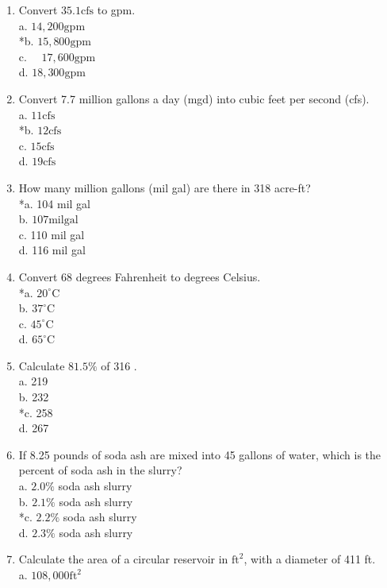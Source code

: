 \begin{enumerate}
\item Convert $35.1 \mathrm{cfs}$ to gpm.\\
a. $14,200 \mathrm{gpm}$\\
*b. $15,800 \mathrm{gpm}$\\
c. $\quad 17,600 \mathrm{gpm}$\\
d. $18,300 \mathrm{gpm}$
\item Convert 7.7 million gallons a day (mgd) into cubic feet per second (cfs).\\
a. $11 \mathrm{cfs}$\\
*b. $12 \mathrm{cfs}$\\
c. $15 \mathrm{cfs}$\\
d. $19 \mathrm{cfs}$\\
\item How many million gallons (mil gal) are there in 318 acre-ft?\\
*a. 104 mil gal\\
b. $107 \mathrm{mil} \mathrm{gal}$\\
c. 110 mil gal\\
d. 116 mil gal\\
\item Convert 68 degrees Fahrenheit to degrees Celsius.\\
*a. $20^{\circ} \mathrm{C}$\\
b. $37^{\circ} \mathrm{C}$\\
c. $45^{\circ} \mathrm{C}$\\
d. $65^{\circ} \mathrm{C}$\\
\item Calculate $81.5 \%$ of 316 .\\
a. 219\\
b. 232\\
*c. 258\\
d. 267\\
\item If 8.25 pounds of soda ash are mixed into 45 gallons of water, which is the percent of soda ash in the slurry?\\
a. $2.0 \%$ soda ash slurry\\
b. $2.1 \%$ soda ash slurry\\
*c. $2.2 \%$ soda ash slurry\\
d. $2.3 \%$ soda ash slurry\\
\item Calculate the area of a circular reservoir in $\mathrm{ft}^{2}$, with a diameter of 411 ft.\\
a. $108,000 \mathrm{ft}^{2}$\\

\end{enumerate}

